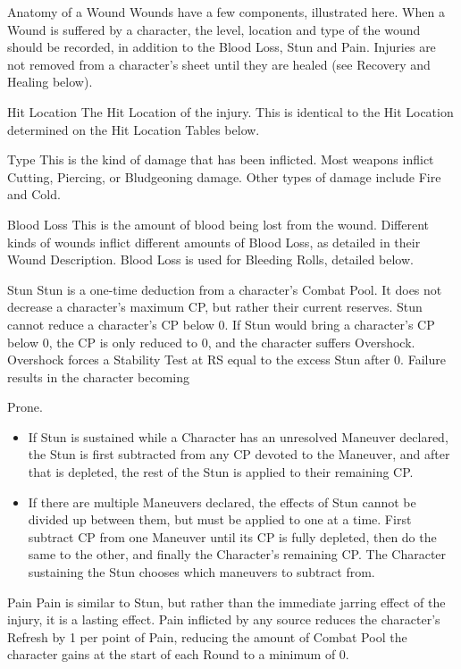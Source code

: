\documentclass[oneside,11pt,english]{book}
\begin{document}
 

Anatomy of a Wound 
Wounds have a few components, illustrated here. When a Wound is suffered by a character, the level, 
location and type of the wound should be recorded, in addition to the Blood Loss, Stun and Pain. Injuries 
are not removed from a character’s sheet until they are healed (see Recovery and Healing below). 

 

Hit Location 
The Hit Location of the injury. This is identical to the Hit Location determined on the Hit Location Tables 
below. 

 

Type 
This is the kind of damage that has been inflicted. Most weapons inflict Cutting, Piercing, or Bludgeoning 
damage. Other types of damage include Fire and Cold. 

 

Blood Loss 
This is the amount of blood being lost from the wound. Different kinds of wounds inflict different 
amounts of Blood Loss, as detailed in their Wound Description. Blood Loss is used for Bleeding Rolls, 
detailed below. 

 

Stun 
Stun is a one-time deduction from a character's Combat Pool. It does not decrease a character's maximum 
CP, but rather their current reserves. Stun cannot reduce a character's CP below 0. If Stun would bring a 
character's CP below 0, the CP is only reduced to 0, and the character suffers Overshock. Overshock 
forces a Stability Test at RS equal to the excess Stun after 0. Failure results in the character becoming 


Prone. 
\begin{itemize}
\item If Stun is sustained while a Character has an unresolved Maneuver declared, the Stun is first 
subtracted from any CP devoted to the Maneuver, and after that is depleted, the rest of the Stun is 
applied to their remaining CP. 
\item If there are multiple Maneuvers declared, the effects of Stun cannot be divided up between them, 
but must be applied to one at a time. First subtract CP from one Maneuver until its CP is fully 
depleted, then do the same to the other, and finally the Character’s remaining CP. The Character 
sustaining the Stun chooses which maneuvers to subtract from. 
\end{itemize}
 

Pain 
Pain is similar to Stun, but rather than the immediate jarring effect of the injury, it is a lasting effect. Pain 
inflicted by any source reduces the character’s Refresh by 1 per point of Pain, reducing the amount of 
Combat Pool the character gains at the start of each Round to a minimum of 0. 
\end{document}
